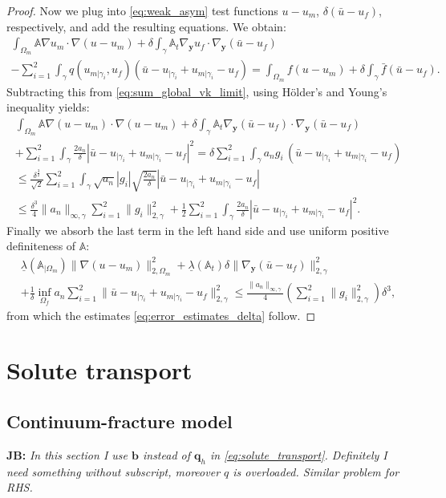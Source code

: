 \documentclass[a4paper]{article}
\def\vc#1{\mathbf{\boldsymbol{#1}}}     %
\def\tn#1{{\mathbb{#1}}}    %
\def\norm#1{\|#1\|}
\def\yy{{\vc y}}
\newcommand{\note}[2]{{\color{blue} \textbf{ #1:} \textit{#2}}}
\begin{document}
\begin{proof}
Now we plug into \eqref{eq:weak_asym} test functions $u-u_m$, $\delta(\bar u-u_f)$, respectively, and add the resulting equations.
We obtain:
\begin{multline*}
\int_{\Omega_m}\tn A\nabla u_m\cdot\nabla(u-u_m) + \delta\int_\gamma\tn A_t\nabla_\yy u_f\cdot\nabla_\yy(\bar u-u_f)\\
- \sum_{i=1}^2\int_\gamma q(u_{m|\gamma_i},u_f)(\bar u - u_{|\gamma_i}+u_{m|\gamma_i} - u_f)
= \int_{\Omega_m} f(u-u_m)
+ \delta\int_\gamma\bar f(\bar u-u_f).
\end{multline*}
Subtracting this from \eqref{eq:sum_global_vk_limit}, using H\"older's and Young's inequality yields:
\begin{multline}
\int_{\Omega_m}\tn A\nabla (u-u_m)\cdot\nabla(u-u_m)
+\delta\int_\gamma\tn A_t\nabla_\yy(\bar u-u_f)\cdot\nabla_\yy(\bar u-u_f)\\
+ \sum_{i=1}^2\int_\gamma \frac{2a_n}\delta |\bar u - u_{|\gamma_i} + u_{m|\gamma_i} - u_f|^2
= \delta\sum_{i=1}^2\int_\gamma a_n g_i\, (\bar u - u_{|\gamma_i} + u_{m|\gamma_i} - u_f)\\
\le \frac{\delta^{\frac32}}{\sqrt2}\sum_{i=1}^2\int_\gamma \sqrt{a_n}|g_i|\sqrt{\frac{2a_n}\delta}|\bar u - u_{|\gamma_i} + u_{m|\gamma_i} - u_f|\\
\le \frac{\delta^3}4\norm{a_n}_{\infty,\gamma}\sum_{i=1}^2\norm{g_i}_{2,\gamma}^2 + \frac12\sum_{i=1}^2\int_\gamma \frac{2a_n}\delta |\bar u - u_{|\gamma_i} + u_{m|\gamma_i} - u_f|^2.
\end{multline}
Finally we absorb the last term in the left hand side and use uniform positive definiteness of $\tn A$:
\begin{multline}
\underline\lambda(\tn A_{|\Omega_m})\norm{\nabla (u-u_m)}_{2,\Omega_m}^2
+\underline\lambda(\tn A_t)\delta\norm{\nabla_\yy(\bar u-u_f)}_{2,\gamma}^2\\
+ \frac1\delta\inf_{\Omega_f}a_n\sum_{i=1}^2\norm{\bar u - u_{|\gamma_i} + u_{m|\gamma_i} - u_f}_{2,\gamma}^2
\le \frac{\norm{a_n}_{\infty,\gamma}}4\left(\sum_{i=1}^2\norm{g_i}_{2,\gamma}^2\right)\delta^3,
\end{multline}
from which the estimates \eqref{eq:error_estimates_delta} follow.
\end{proof}

\section{Solute transport}
\subsection{Continuum-fracture model}
\note{JB}{In this section I use $\vc b$ instead of $\vc q_h$ in \eqref{eq:solute_transport}. Definitely I need something without subscript, moreover $q$ is overloaded.
Similar problem for RHS.}
\end{document}
